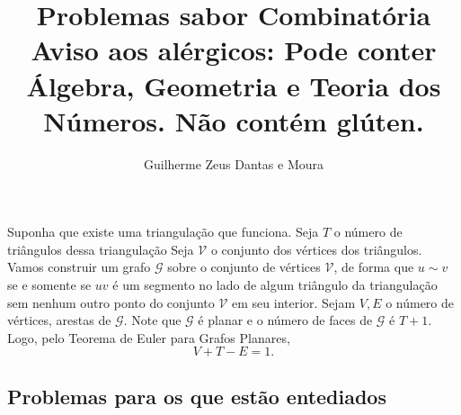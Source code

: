 \documentclass[10pt,a4paper]{article}
\title{Problemas sabor Combinatória \\ \normalsize Aviso aos alérgicos: \normalfont Pode conter Álgebra, Geometria e Teoria dos Números. Não contém glúten.}
\author{Guilherme Zeus Dantas e Moura}
\begin{document}
	
 	\zeustitle

	\begin{sk}
		Suponha que existe uma triangulação que funciona. Seja $T$ o número de triângulos dessa triangulação Seja $\mathcal V$ o conjunto dos vértices dos triângulos. Vamos construir um grafo $\mathcal G$ sobre o conjunto de vértices $\mathcal V$, de forma que $u \sim v$ se e somente se $uv$ é um segmento no lado de algum triângulo da triangulação sem nenhum outro ponto do conjunto $\mathcal V$ em seu interior. Sejam $V, E$ o número de vértices, arestas de $\mathcal G$. Note que $\mathcal G$ é planar e o número de faces de $\mathcal G$ é $T + 1$. Logo, pelo Teorema de Euler para Grafos Planares,  \[
			V + T - E = 1.
		\] 
	\end{sk}
	\renewcommand\playerA[1]{Bean}
	\renewcommand\playerB[1]{Dagm{\ae}r}
	\renewcommand\playerA[1]{Elfo}
	\renewcommand\playerB[1]{Luci}

	\begin{center}
		\section*{Problemas para os que estão entediados}
	\end{center}

\end{document}

